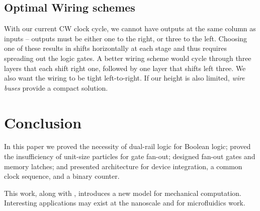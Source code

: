 \documentclass[letterpaper, 10 pt, conference]{ieeeconf}
\newcommand{\todo}[1]{\vspace{5 mm}\par \noindent \framebox{\begin{minipage}[c]{0.98 \columnwidth} \ttfamily\flushleft \textcolor{red}{#1}\end{minipage}}\vspace{5 mm}\par}
\begin{document}
\todo{These are comparable to a ripple-carry adder:  the delay for $n$ bits is  and requires $x=$ gates.
Numerous other schemes exist to speed up the computation.  The advantage of gates is that they are easily reused and connected.  If speed was critical, instead of using discrete gates, we could engineer the workspace to directly compute logic.  }

\subsection{Optimal Wiring schemes}\label{sec:wiring}
With our current CW clock cycle, we cannot have outputs at the same column as inputs -- outputs must be either one to the right, or three to the left.  Choosing one of these results in shifts horizontally at each stage and thus requires spreading out the logic gates. A better wiring scheme would cycle through three layers that each shift right one, followed by one layer that shifts left three.  We also want the wiring to be tight left-to-right.  If our height is also limited, \emph{wire buses} provide a compact solution. 

\section{Conclusion}\label{sec:Conclusion}
In this paper we proved the necessity of dual-rail logic for Boolean logic;  proved the insufficiency of unit-size particles for gate fan-out; designed {\sc fan-out} gates and memory latches; and presented architecture for device integration,  a common clock sequence, and a binary counter.

This work, along with \cite{Becker2013f,Becker2014,Becker2014a}, introduces a new model for mechanical computation.  Interesting applications may exist at the nanoscale and for microfluidics work.

    
   

\end{document}
